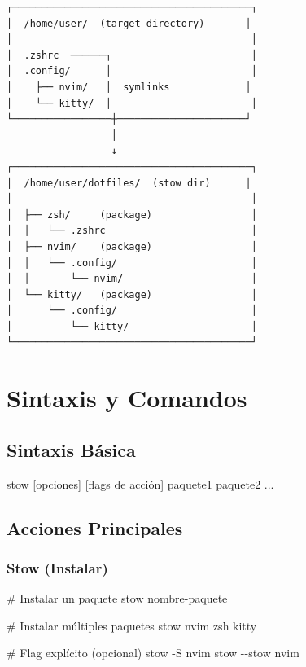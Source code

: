 \documentclass[
  doc,
  floatsintext,
  longtable,
  a4paper,
  nolmodern,
  notxfonts,
  notimes,
  12pt,
  colorlinks=true,linkcolor=blue,citecolor=blue,urlcolor=blue]{apa7}
\newenvironment{Shaded}{\begin{snugshade}}{\end{snugshade}}
\newcommand{\AttributeTok}[1]{\textcolor[rgb]{0.40,0.45,0.13}{#1}}
\newcommand{\CommentTok}[1]{\textcolor[rgb]{0.37,0.37,0.37}{#1}}
\newcommand{\ExtensionTok}[1]{\textcolor[rgb]{0.00,0.23,0.31}{#1}}
\newcommand{\NormalTok}[1]{\textcolor[rgb]{0.00,0.23,0.31}{#1}}
\newcommand{\PreprocessorTok}[1]{\textcolor[rgb]{0.68,0.00,0.00}{#1}}
\newcommand{\SpecialStringTok}[1]{\textcolor[rgb]{0.13,0.47,0.30}{#1}}
\begin{document}
\begin{verbatim}
┌─────────────────────────────────────────┐
│  /home/user/  (target directory)       │
│                                         │
│  .zshrc  ──────┐                        │
│  .config/      │                        │
│    ├── nvim/   │  symlinks             │
│    └── kitty/  │                        │
└─────────────────┼──────────────────────┘
                  │
                  ↓
┌─────────────────────────────────────────┐
│  /home/user/dotfiles/  (stow dir)      │
│                                         │
│  ├── zsh/     (package)                 │
│  │   └── .zshrc                         │
│  ├── nvim/    (package)                 │
│  │   └── .config/                       │
│  │       └── nvim/                      │
│  └── kitty/   (package)                 │
│      └── .config/                       │
│          └── kitty/                     │
└─────────────────────────────────────────┘
\end{verbatim}

\section{Sintaxis y Comandos}\label{sintaxis-y-comandos}

\subsection{Sintaxis Básica}\label{sintaxis-buxe1sica}

\begin{Shaded}
\begin{Highlighting}[]
\ExtensionTok{stow} \PreprocessorTok{[}\SpecialStringTok{opciones}\PreprocessorTok{]}\NormalTok{ [flags de acción] paquete1 paquete2 ...}
\end{Highlighting}
\end{Shaded}

\subsection{Acciones Principales}\label{acciones-principales}

\subsubsection{Stow (Instalar)}\label{stow-instalar}

\begin{Shaded}
\begin{Highlighting}[]
\CommentTok{\# Instalar un paquete}
\ExtensionTok{stow}\NormalTok{ nombre{-}paquete}

\CommentTok{\# Instalar múltiples paquetes}
\ExtensionTok{stow}\NormalTok{ nvim zsh kitty}

\CommentTok{\# Flag explícito (opcional)}
\ExtensionTok{stow} \AttributeTok{{-}S}\NormalTok{ nvim}
\ExtensionTok{stow} \AttributeTok{{-}{-}stow}\NormalTok{ nvim}
\end{Highlighting}
\end{Shaded}
\end{document}
